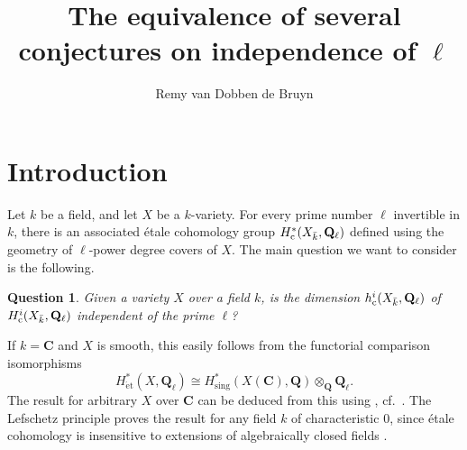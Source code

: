 \documentclass[11pt]{amsart}
\title{The equivalence of several conjectures on independence of $\ell$}
\author{Remy van Dobben de Bruyn}
\newtheorem{question}{Question}
\theoremstyle{definition}
\newcommand{\Q}{\mathbf Q}
\newcommand{\C}{\mathbf C}
\newcommand{\cs}{_{\text{\normalfont c}}}
\newcommand{\et}{_{\operatorname{\acute et}}}
\begin{document}


\maketitle


\begin{prelims}

\DisplayAbstractInEnglish

\bigskip

\DisplayKeyWords

\medskip

\DisplayMSCclass

\bigskip


\bigskip

\DisplayTitleInFrench

\medskip

\DisplayAbstractInFrench

\end{prelims}



\newpage

\setcounter{tocdepth}{2}

\tableofcontents





\section*{Introduction}
Let $k$ be a field, and let $X$ be a $k$-variety. For every prime
number $\ell$ invertible in $k$, there is an associated \'etale
cohomology group $H^*\cs(X_{\bar k},\Q_\ell)$ defined using the
geometry of $\ell$-power degree covers of $X$. The main question we
want to consider is the following.

\begin{question}
Given a variety $X$ over a field $k$, is the dimension
$h^i\cs(X_{\bar k},\Q_\ell)$ of $H^i\cs(X_{\bar k},\Q_\ell)$
independent of the prime $\ell$?
\end{question}

If $k = \C$ and $X$ is smooth, this easily follows from the
functorial comparison isomorphisms
\cite[exp.~XI,~th.~4.4(iii)]{SGA4III}
\[
H^*\et(X,\Q_\ell) \cong H^*_{\operatorname{sing}}(X(\C),\Q)
\otimes_\Q \Q_\ell.
\]
The result for arbitrary $X$ over $\C$ can be deduced from this
using , cf.~\cite[6.2.8]{Hdg3}. The
Lefschetz principle proves the result for any field $k$ of
characteristic $0$, since \'etale cohomology is insensitive to
extensions of algebraically closed fields
\cite[exp.~XVI,~cor.~1.6]{SGA4III}.
\end{document}
